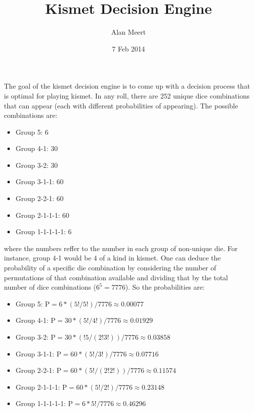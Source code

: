 \documentclass[10pt, onecolumn]{article}
\title{Kismet Decision Engine}
\author{Alan Meert}
\date{7 Feb 2014}
\begin{document}
\maketitle

The goal of the kismet decision engine is to come up with a decision process that is optimal for playing kismet. 
In any roll, there are 252 unique dice combinations that can appear (each with different probabilities of appearing).
The possible combinations are:
\begin{itemize} 
\item Group 5: 6 
\item Group 4-1: 30 
\item Group 3-2: 30 
\item Group 3-1-1: 60 
\item Group 2-2-1: 60 
\item Group 2-1-1-1: 60 
\item Group 1-1-1-1-1: 6 
\end{itemize}
where the numbers reffer to the number in each group of non-unique die. For instance, group 4-1 would be 4 of a kind in kismet. 
One can deduce the probability of a specific die combination by considering the number of permutations of that combination available and dividing
that by the total number of dice combinations ($6^5=7776$). So the probabilities are:
\begin{itemize} 
\item Group 5: P$=6*(5!/5!)/7776 \approx  0.00077$
\item Group 4-1: P$=30*(5!/4!)/7776 \approx  0.01929$ 
\item Group 3-2: P$=30*(!5/(2!3!))/7776 \approx  0.03858$ 
\item Group 3-1-1: P$=60*(5!/3!)/7776 \approx 0.07716$ 
\item Group 2-2-1: P$=60*(5!/(2!2!))/7776 \approx  0.11574$ 
\item Group 2-1-1-1: P$=60*(5!/2!)/7776 \approx  0.23148$ 
\item Group 1-1-1-1-1: P$=6*5!/7776 \approx  0.46296$ 
\end{itemize}
 
\end{document}
